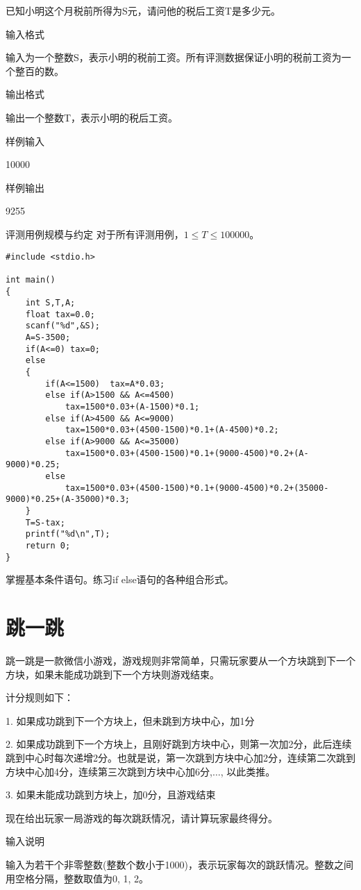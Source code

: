 已知小明这个月税前所得为S元，请问他的税后工资T是多少元。

输入格式

输入为一个整数S，表示小明的税前工资。所有评测数据保证小明的税前工资为一个整百的数。

输出格式

输出一个整数T，表示小明的税后工资。

样例输入

10000

样例输出

9255

评测用例规模与约定
对于所有评测用例，$1\le T\le 100000$。

\begin{lstlisting}
#include <stdio.h>

int main()
{
	int S,T,A;
	float tax=0.0;
	scanf("%d",&S);
	A=S-3500;
	if(A<=0) tax=0;
	else
	{
		if(A<=1500)  tax=A*0.03;	
		else if(A>1500 && A<=4500) 
			tax=1500*0.03+(A-1500)*0.1;
		else if(A>4500 && A<=9000) 
			tax=1500*0.03+(4500-1500)*0.1+(A-4500)*0.2;
		else if(A>9000 && A<=35000) 
			tax=1500*0.03+(4500-1500)*0.1+(9000-4500)*0.2+(A-9000)*0.25;
		else 
			tax=1500*0.03+(4500-1500)*0.1+(9000-4500)*0.2+(35000-9000)*0.25+(A-35000)*0.3;
	} 
	T=S-tax;
	printf("%d\n",T);
	return 0;
} 
\end{lstlisting}

\begin{note}[要点]
	掌握基本条件语句。练习if else语句的各种组合形式。
\end{note}

\section{跳一跳}
跳一跳是一款微信小游戏，游戏规则非常简单，只需玩家要从一个方块跳到下一个方块，如果未能成功跳到下一个方块则游戏结束。

计分规则如下：

1. 如果成功跳到下一个方块上，但未跳到方块中心，加1分

2. 如果成功跳到下一个方块上，且刚好跳到方块中心，则第一次加2分，此后连续跳到中心时每次递增2分。也就是说，第一次跳到方块中心加2分，连续第二次跳到方块中心加4分，连续第三次跳到方块中心加6分,$\dots$, 以此类推。

3. 如果未能成功跳到方块上，加0分，且游戏结束

现在给出玩家一局游戏的每次跳跃情况，请计算玩家最终得分。

输入说明
	
输入为若干个非零整数(整数个数小于1000)，表示玩家每次的跳跃情况。整数之间用空格分隔，整数取值为0, 1, 2。

